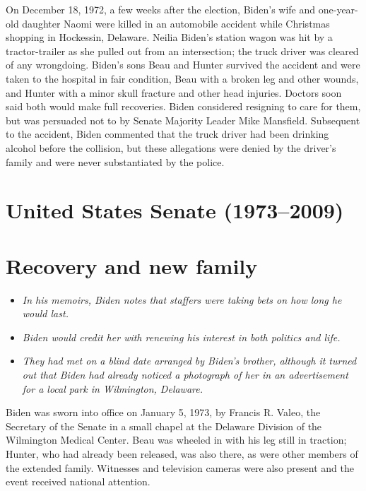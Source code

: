 On December 18, 1972, a few weeks after the election, Biden's wife and
one-year-old daughter Naomi were killed in an automobile accident while
Christmas shopping in Hockessin, Delaware. Neilia Biden's station wagon
was hit by a tractor-trailer as she pulled out from an intersection; the
truck driver was cleared of any wrongdoing. Biden's sons Beau and Hunter
survived the accident and were taken to the hospital in fair condition,
Beau with a broken leg and other wounds, and Hunter with a minor skull
fracture and other head injuries. Doctors soon said both would make full
recoveries. Biden considered resigning to care for them, but was
persuaded not to by Senate Majority Leader Mike Mansfield. Subsequent to
the accident, Biden commented that the truck driver had been drinking
alcohol before the collision, but these allegations were denied by the
driver's family and were never substantiated by the police.

\section{United States Senate
(1973--2009)}\label{united-states-senate-19732009}

\section{Recovery and new family}\label{recovery-and-new-family}

\begin{itemize}
\item
  \emph{In his memoirs, Biden notes that staffers were taking bets on
  how long he would last.}
\item
  \emph{Biden would credit her with renewing his interest in both
  politics and life.}
\item
  \emph{They had met on a blind date arranged by Biden's brother,
  although it turned out that Biden had already noticed a photograph of
  her in an advertisement for a local park in Wilmington, Delaware.}
\end{itemize}

Biden was sworn into office on January 5, 1973, by Francis R. Valeo, the
Secretary of the Senate in a small chapel at the Delaware Division of
the Wilmington Medical Center. Beau was wheeled in with his leg still in
traction; Hunter, who had already been released, was also there, as were
other members of the extended family. Witnesses and television cameras
were also present and the event received national attention.

